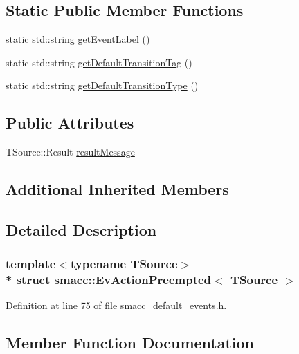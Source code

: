 \subsection*{Static Public Member Functions}
\begin{DoxyCompactItemize}
\item 
static std\+::string \hyperlink{structsmacc_1_1EvActionPreempted_a7c229ae65877dd5959c8858cc4fdab8d}{get\+Event\+Label} ()
\item 
static std\+::string \hyperlink{structsmacc_1_1EvActionPreempted_a9376d969dd4f1696089598e4abd50f30}{get\+Default\+Transition\+Tag} ()
\item 
static std\+::string \hyperlink{structsmacc_1_1EvActionPreempted_a09cb749b2aa9c7accb6ab9f575dbbac4}{get\+Default\+Transition\+Type} ()
\end{DoxyCompactItemize}
\subsection*{Public Attributes}
\begin{DoxyCompactItemize}
\item 
T\+Source\+::\+Result \hyperlink{structsmacc_1_1EvActionPreempted_a1acd71e46bed77ebbb43c8e86415e69e}{result\+Message}
\end{DoxyCompactItemize}
\subsection*{Additional Inherited Members}


\subsection{Detailed Description}
\subsubsection*{template$<$typename T\+Source$>$\\*
struct smacc\+::\+Ev\+Action\+Preempted$<$ T\+Source $>$}



Definition at line 75 of file smacc\+\_\+default\+\_\+events.\+h.



\subsection{Member Function Documentation}
